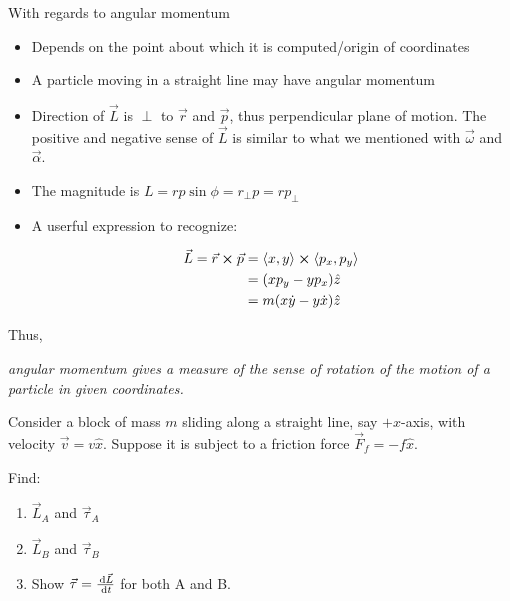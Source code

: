 \begin{remark}
	With regards to angular momentum
	\begin{itemize}
		\item Depends on the point about which it is computed/origin of coordinates
		\item A particle moving in a straight line may have angular momentum
		\item Direction of $\vec L$ is $\perp$ to $\vec r$ and $\vec p$, thus perpendicular plane of motion. The positive and negative sense of $\vec L$ is similar to what we mentioned with $\vec \omega$ and $\vec \alpha$.
		\item The magnitude is $L = rp\sin\phi = r_\perp p = rp_\perp$
		\item A userful expression to recognize:
		
		\begin{align}
			\vec L = \vec r \cross \vec p &= \langle x, y \rangle \cross \langle p_x, p_y \rangle\\
			&= (xp_y - yp_x) \hat z\\
			&= m (x\dot y - y \dot x) \hat z
		\end{align}
	\end{itemize}

	Thus,

	\textit{angular momentum gives a measure of the sense of rotation of the motion of a particle in given coordinates.}
\end{remark}

\begin{example}
	Consider a block of mass $m$ sliding along a straight line, say $+x$-axis, with velocity $\vec v = v \hat x$. Suppose it is subject to a friction force $\vec F_f = - f \hat x$.

	Find:

	\begin{enumerate}
		\item $\vec L_A$ and $\vec \tau_A$
		\item $\vec L_B$ and $\vec \tau_B$
		\item Show $\vec \tau = \frac{\D \vec L}{\D t}$ for both A and B.
	\end{enumerate}
\end{example}

